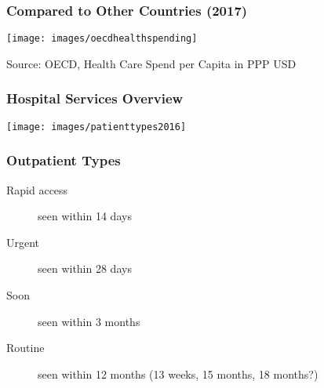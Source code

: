 \documentclass[dvipsnames]{beamer}
\begin{document}
\begin{frame}
\frametitle{Compared to Other Countries (2017)}
\texttt{[image: images/oecdhealthspending]}

\vspace{0.5cm}
{\scriptsize Source: OECD, Health Care Spend per Capita in PPP USD}
\end{frame}




\begin{frame}
\frametitle{Hospital Services Overview}
\texttt{[image: images/patienttypes2016]}
{\scriptsize {}}
\end{frame}

\begin{frame}
\frametitle{Outpatient Types}
\begin{description}
\item[Rapid access] seen within 14 days
\item[Urgent] seen within 28 days
\item[Soon] seen within 3 months
\item[Routine] seen within 12 months (13 weeks, 15 months, 18 months?)
\end{description}
\end{frame}
\end{document}
